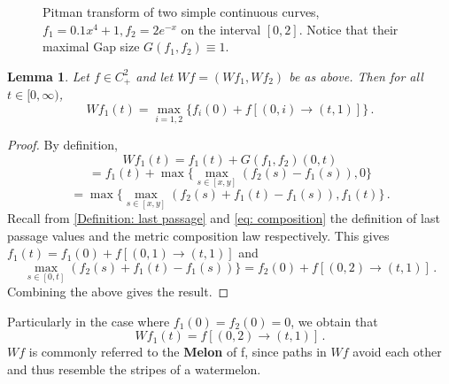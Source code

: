 \documentclass[12pt]{report}
\theoremstyle{plain}
\newtheorem{lemma}[theorem]{Lemma}
\begin{document}
\begin{figure}%
\centering
{}
\caption{Pitman transform of two simple continuous curves, \(f_1 = 0.1x^{4}+1, f_2 = 2e^{-x}\) on the interval \([0,2]\). Notice that their maximal Gap size \(G(f_1, f_2)\equiv 1\).}
    \label{fig:pitman}
\end{figure}
\begin{lemma}\label{lemma: Pitman melon}
    Let \(f\in C^2_+\) and let \(Wf = (Wf_1, Wf_2)\) be as above. Then for all \(t\in[0,\infty)\),
    \[
    Wf_1(t) = \displaystyle \max_{i=1,2}\{f_i(0) + f [(0, i) \to (t, 1)]\} \,.
    \]
\end{lemma}%

\begin{proof}
    By definition, 
    \[
    Wf_1(t) = f_1(t)+G(f_1, f_2)(0,t)\]
    \[
    = f_1(t) + \max\{\displaystyle \max_{s\in[x,y]}(f_2(s)-f_1(s)), 0 \}
    \]
    \[
    = \max\{\displaystyle \max_{s\in[x,y]}(f_2(s)+f_1(t)-f_1(s)), f_1(t) \}\,.
    \]
    Recall from \ref{Definition: last passage} and \ref{eq: composition} the definition of last passage values and the metric composition law respectively. This gives \(f_1(t) = f_1(0) + f [(0, 1) \to (t, 1)]\) and \[ \displaystyle \max_{s\in[0,t]}(f_2(s) + f_1(t) - f_1(s))\} = f_2(0) + f [(0, 2) \to (t, 1)]\,.\] Combining the above gives the result. 
\end{proof}


Particularly in the case where \(f_1(0) = f_2(0) = 0\), we obtain that 
\[
Wf_1(t) = f [(0, 2) \to (t, 1)]\,.
\]
\(Wf\) is commonly referred to the \textbf{Melon} of f, since paths in \(Wf\) avoid each other and thus resemble the stripes of a watermelon.\\
\end{document}
